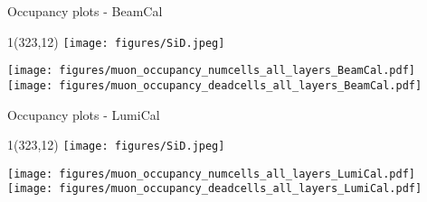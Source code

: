 \documentclass[xcolor={dvipsnames}]{beamer}
\newcommand{\sidlogo}{
  \setlength{\TPHorizModule}{1pt}
  \setlength{\TPVertModule}{1pt}
  \begin{textblock}{1}(323,12)
   \texttt{[image: figures/SiD.jpeg]}
  \end{textblock}
  }
\begin{document}
\begin{frame}{Occupancy plots - \small BeamCal}
\sidlogo
 \begin{center}
\texttt{[image: figures/muon\_occupancy\_numcells\_all\_layers\_BeamCal.pdf]}
\texttt{[image: figures/muon\_occupancy\_deadcells\_all\_layers\_BeamCal.pdf]}
\end{center}
\end{frame}
\begin{frame}{Occupancy plots - \small LumiCal}
\sidlogo
 \begin{center}
\texttt{[image: figures/muon\_occupancy\_numcells\_all\_layers\_LumiCal.pdf]}
\texttt{[image: figures/muon\_occupancy\_deadcells\_all\_layers\_LumiCal.pdf]}
\end{center}
\end{frame}
\end{document}
